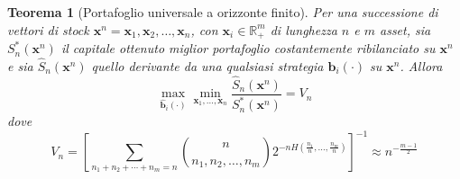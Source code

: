 \documentclass[a4paper,11pt]{book}
\theoremstyle{plain}
\newtheorem{teo}{Teorema}[chapter]
\theoremstyle{definition}
\theoremstyle{remark}
\newcommand{\R}{\mathbb{R}}
\newcommand{\x}{\bm{x}}
\newcommand{\bh}{\hat{\bm{b}}}
\newcommand{\Sh}{\hat{S}}
\begin{document}
\begin{teo}[Portafoglio universale a orizzonte finito]\label{teo:univ-finite}
	Per una successione di vettori di stock $\x^n = \x_1,\x_2,\ldots,\x_n$, con $\x_i\in \R^m_+$ di lunghezza $n$ e $m$ asset, sia $S_n^*(\x^n)$ il capitale ottenuto miglior portafoglio costantemente ribilanciato su $\x^n$ e sia $\Sh_n(\x^n)$ quello derivante da una qualsiasi strategia $\bh_i(\cdot)$ su $\x^n$. Allora
	\begin{equation*}
		\max\limits_{\bh_i(\cdot)}\min\limits_{\x_1,\ldots, \x_{n}}\frac{\Sh_n(\x^n)}{S_n^*(\x^n)}=V_n
	\end{equation*}
	dove
	\begin{equation*}
		V_n=\left[\sum_{n_1+n_2+\cdots+n_m=n}{\binom{n}{n_1,n_2,\ldots,n_m}2^{-nH\left(\frac{n_1}{n},\ldots,\frac{n_m}{n}\right)}}\right]^{-1}\approx n^{-\frac{m-1}{2}}
	\end{equation*}
\end{teo}
\end{document}
